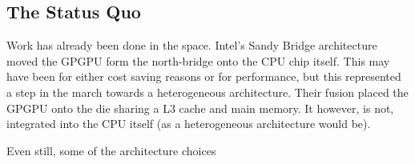 \subsection*{The Status Quo}

Work has already been done in the space. Intel's Sandy Bridge architecture moved the GPGPU form the north-bridge onto the CPU chip itself. This may have been for either cost saving reasons or for performance, but this represented a step in the march towards a heterogeneous architecture. Their fusion placed the GPGPU onto the die sharing a L3 cache and main memory. It however, is not, integrated into the CPU itself (as a heterogeneous architecture would be). 

Even still, some of the architecture choices 
